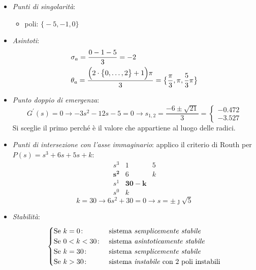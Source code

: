 \begin{esercizio}
\begin{itemize}
	\item \emph{Punti di singolarità}:
		\begin{itemize}
			\item poli: \(\bigl\{ -5, -1, 0 \bigr\}\)
		\end{itemize}
	\item \emph{Asintoti}:
		\begin{align*}
			& \sigma_a = \frac{0-1-5}{3} = -2 \\
			& \theta_a = \frac{\Bigl( 2 \cdot \bigl\{ 0, \dots, 2 \bigr\} +1 \Bigr) \pi}{3} = \bigl\{ \frac{\pi}{3}, \pi, \frac{5}{3}\pi \bigr\}
		\end{align*}
	\item \emph{Punto doppio di emergenza}:
		\[
			G^\prime (s) = 0 \rightarrow -3s^2 -12s -5=0 \rightarrow s_{1,2} = \frac{-6\pm\sqrt{21}}{3} = \begin{cases} \bm{-0.472} \\ -3.527 \end{cases}
		\]
		Si sceglie il primo perché è il valore che appartiene al luogo delle radici.
	\item \emph{Punti di intersezione con l'asse immaginario}:
		applico il criterio di Routh per \(P(s) = s^3 +6s +5s +k\):
		\[\begin{array}{r|rr}
			s^3      & 1 & 5 \\
			\bm{s^2} & 6 & k \\
			s^1      & \bm{30-k} \\
			s^0      & k
		\end{array}\]
		\[
			k = 30 \rightarrow 6s^2+30 = 0 \rightarrow s = \pm \jmath \sqrt{5}
		\]
	\item \emph{Stabilità}:
		\[\begin{cases}
			\text{Se } k = 0\colon & \text{sistema \emph{semplicemente stabile}} \\
			\text{Se } 0 < k < 30\colon & \text{sistema \emph{asintoticamente stabile}} \\
			\text{Se } k = 30\colon & \text{sistema \emph{semplicemente stabile}} \\
			\text{Se } k > 30\colon & \text{sistema \emph{instabile} con 2 poli instabili}
		\end{cases}\]
\end{itemize}
\end{esercizio}

